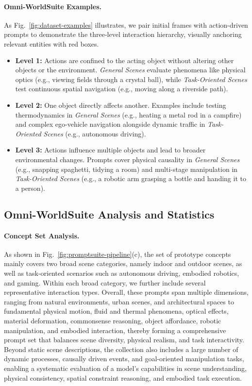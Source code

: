 \paragraph{Omni-WorldSuite Examples.}
As Fig.~\ref{fig:dataset-examples} illustrates, we pair initial frames with action-driven prompts to demonstrate the three-level interaction hierarchy, visually anchoring relevant entities with red boxes.
\begin{itemize}
    \item \textbf{Level 1:} Actions are confined to the acting object without altering other objects or the environment. \textit{General Scenes} evaluate phenomena like physical optics (e.g., viewing fields through a crystal ball), while \textit{Task-Oriented Scenes} test continuous spatial navigation (e.g., moving along a riverside path).
    \item \textbf{Level 2:} One object directly affects another. Examples include testing thermodynamics in \textit{General Scenes} (e.g., heating a metal rod in a campfire) and complex ego-vehicle navigation alongside dynamic traffic in \textit{Task-Oriented Scenes} (e.g., autonomous driving).
    \item \textbf{Level 3:} Actions influence multiple objects and lead to broader environmental changes. Prompts cover physical causality in \textit{General Scenes} (e.g., snapping spaghetti, tidying a room) and multi-stage manipulation in \textit{Task-Oriented Scenes} (e.g., a robotic arm grasping a bottle and handing it to a person).
\end{itemize}






\subsection{Omni-WorldSuite Analysis and Statistics}


\paragraph{Concept Set Analysis.}
As shown in Fig.~\ref{fig:promptsuite-pipeline}(c), the set of prototype concepts mainly covers two broad scene categories, namely indoor and outdoor scenes, as well as task-oriented scenarios such as autonomous driving, embodied robotics, and gaming. Within each broad category, we further include several representative interaction types. Overall, these prompts span multiple dimensions, ranging from natural environments, urban scenes, and architectural spaces to fundamental physical motion, fluid and thermal phenomena, optical effects, material deformation, commonsense reasoning, object affordance, robotic manipulation, and embodied interaction, thereby forming a comprehensive prompt set that balances scene diversity, physical realism, and task interactivity. Beyond static scene descriptions, the collection also includes a large number of dynamic processes, causally driven events, and goal-oriented manipulation tasks, enabling a systematic evaluation of a model’s capabilities in scene understanding, physical consistency, spatial constraint reasoning, and embodied task execution.

